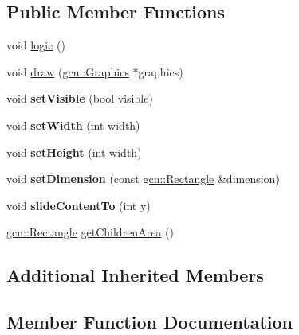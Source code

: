 \subsection*{Public Member Functions}
\begin{DoxyCompactItemize}
\item 
void \hyperlink{classFFContainer_a5d53541089f719665bfc2d689dab89c6}{logic} ()
\item 
void \hyperlink{classFFContainer_a42352820e4ed070f831a84a8b51451c6}{draw} (\hyperlink{classgcn_1_1Graphics}{gcn\+::\+Graphics} $\ast$graphics)
\item 
void {\bfseries set\+Visible} (bool visible)\hypertarget{classFFContainer_a7b79e941fd38a871b2b893858b786ce1}{}\label{classFFContainer_a7b79e941fd38a871b2b893858b786ce1}

\item 
void {\bfseries set\+Width} (int width)\hypertarget{classFFContainer_a4f1f5ba45a48ecfba79e7ec88ee6b010}{}\label{classFFContainer_a4f1f5ba45a48ecfba79e7ec88ee6b010}

\item 
void {\bfseries set\+Height} (int width)\hypertarget{classFFContainer_aa91986bab12d8ea8598d8b712959f40f}{}\label{classFFContainer_aa91986bab12d8ea8598d8b712959f40f}

\item 
void {\bfseries set\+Dimension} (const \hyperlink{classgcn_1_1Rectangle}{gcn\+::\+Rectangle} \&dimension)\hypertarget{classFFContainer_a271182e93c5317594d5e71e4db3074ae}{}\label{classFFContainer_a271182e93c5317594d5e71e4db3074ae}

\item 
void {\bfseries slide\+Content\+To} (int y)\hypertarget{classFFContainer_a551953811ba44c76aad11733897f7960}{}\label{classFFContainer_a551953811ba44c76aad11733897f7960}

\item 
\hyperlink{classgcn_1_1Rectangle}{gcn\+::\+Rectangle} \hyperlink{classFFContainer_af509106f3e9c8d69e821d864abfa1f7d}{get\+Children\+Area} ()
\end{DoxyCompactItemize}
\subsection*{Additional Inherited Members}


\subsection{Member Function Documentation}
